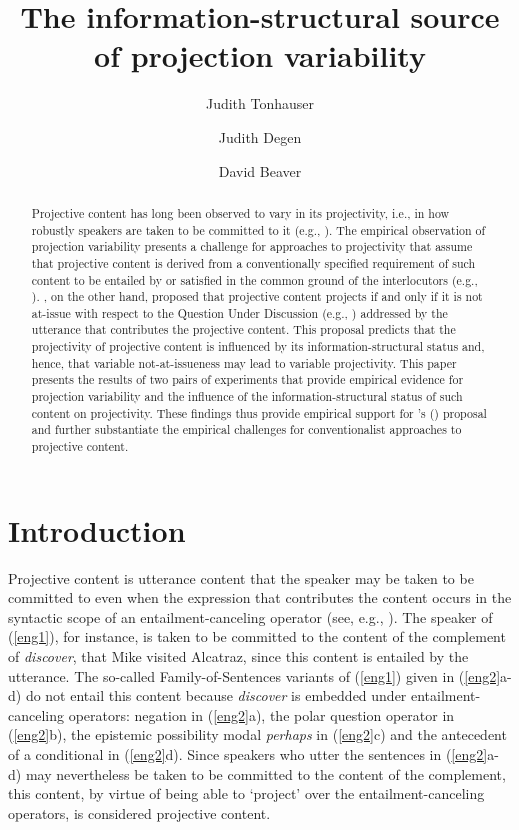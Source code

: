 \documentclass[11pt,fleqn]{article}
\title{The information-structural source of projection variability}
\author[$\bullet$]{Judith Tonhauser}
\author[$\triangleright$]{Judith Degen}
\author[$\circ$]{David Beaver}
\affil[$\bullet$]{The Ohio State University}
\affil[$\triangleright$]{Stanford University}
\affil[$\circ$]{University of Texas at Austin}
\newcommand{\6}{\mbox{$[\hspace*{-.6mm}[$}}
\newcommand{\9}{\mbox{$]\hspace*{-.6mm}]$}}
\newcommand{\citetpos}[1]{\citeauthor{#1}'s (\citeyear{#1})}
\begin{document}
\maketitle

\begin{abstract}

Projective content has long been observed to vary in its projectivity, i.e., in how robustly speakers are taken to be committed to it (e.g., \citealt{karttunen71b,ccmg90,simons01,abusch10}). The empirical observation of projection variability presents a challenge for approaches to projectivity that assume that projective content is derived from a conventionally specified requirement of such content to be entailed by or satisfied in the common ground of the interlocutors (e.g., \citealt{heim83,vds92}). \citet{brst-salt10}, on the other hand, proposed that projective content projects if and only if it is not at-issue with respect to the Question Under Discussion (e.g., \citealt{roberts12}) addressed by the utterance that contributes the projective content. This proposal predicts that the projectivity of projective content is influenced by its information-structural status and, hence, that variable not-at-issueness may lead to variable projectivity. This paper presents the results of two pairs of experiments that provide empirical evidence for projection variability and the influence of the information-structural status of such content on projectivity. These findings thus provide empirical support for \citetpos{brst-salt10} proposal and further substantiate the empirical challenges for conventionalist approaches to projective content.

\end{abstract}


			
\section{Introduction}\label{s1}

Projective content is utterance content that the speaker may be taken to be committed to even when the expression that contributes the content occurs in the syntactic scope of an entailment-canceling operator (see, e.g., \citealt{ccmg90}). The speaker of (\ref{eng1}), for instance, is taken to be committed to the content of the complement of {\em discover}, that Mike visited Alcatraz, since this content is entailed by the utterance. The so-called Family-of-Sentences variants of (\ref{eng1}) given in (\ref{eng2}a-d) do not entail this content because {\em discover} is embedded under entailment-canceling operators: negation in (\ref{eng2}a), the polar question operator in (\ref{eng2}b), the epistemic possibility modal {\em perhaps} in (\ref{eng2}c) and the antecedent of a conditional in (\ref{eng2}d). Since speakers who utter the sentences in (\ref{eng2}a-d) may nevertheless be taken to be committed to the content of the complement, this content, by virtue of being able to `project' over the entailment-canceling operators, is considered projective content. 
\end{document}
